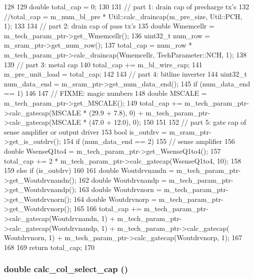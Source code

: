 \begin{DoxyCode}
128 {
129     double total_cap = 0;
130 
131     // part 1: drain cap of precharge tx's
132     //total_cap = m_num_bl_pre * Util::calc_draincap(m_pre_size, Util::PCH, 1);
133 
134     // part 2: drain cap of pass tx's
135     double Wmemcellr = m_tech_param_ptr->get_Wmemcellr();
136     uint32_t num_row = m_sram_ptr->get_num_row();
137     total_cap = num_row * m_tech_param_ptr->calc_draincap(Wmemcellr, 
      TechParameter::NCH, 1);
138 
139     // part 3: metal cap
140     total_cap += m_bl_wire_cap;
141     m_pre_unit_load = total_cap;
142 
143     // part 4: bitline inverter
144     uint32_t num_data_end = m_sram_ptr->get_num_data_end();
145     if (num_data_end == 1)
146     {
147         // FIXME: magic numbers
148         double MSCALE = m_tech_param_ptr->get_MSCALE();
149         total_cap += m_tech_param_ptr->calc_gatecap(MSCALE * (29.9 + 7.8), 0) + 
      m_tech_param_ptr->calc_gatecap(MSCALE * (47.0 + 12.0), 0);
150     }
151 
152     // part 5: gate cap of sense amplifier or output driver
153     bool is_outdrv = m_sram_ptr->get_is_outdrv();
154     if (num_data_end == 2)
155     { // sense amplifier
156         double WsenseQ1to4 = m_tech_param_ptr->get_WsenseQ1to4();
157         total_cap += 2 * m_tech_param_ptr->calc_gatecap(WsenseQ1to4, 10);
158     }
159     else if (is_outdrv)
160     {
161         double Woutdrvnandn = m_tech_param_ptr->get_Woutdrvnandn();
162         double Woutdrvnandp = m_tech_param_ptr->get_Woutdrvnandp();
163         double Woutdrvnorn = m_tech_param_ptr->get_Woutdrvnorn();
164         double Woutdrvnorp = m_tech_param_ptr->get_Woutdrvnorp();
165 
166         total_cap += m_tech_param_ptr->calc_gatecap(Woutdrvnandn, 1) + 
      m_tech_param_ptr->calc_gatecap(Woutdrvnandp, 1) + m_tech_param_ptr->calc_gatecap(
      Woutdrvnorn, 1) + m_tech_param_ptr->calc_gatecap(Woutdrvnorp, 1);
167     }
168 
169     return total_cap;
170 }
\end{DoxyCode}
\hypertarget{classBitlineUnit_a52364fe6b4c48632e06db38ca40bd454}{
\subsubsection[{calc\_\-col\_\-select\_\-cap}]{\setlength{\rightskip}{0pt plus 5cm}double calc\_\-col\_\-select\_\-cap ()}}
\label{classBitlineUnit_a52364fe6b4c48632e06db38ca40bd454}



